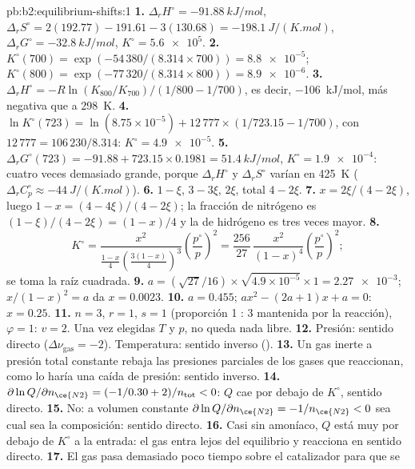 \begin{solution}{pb:b2:equilibrium-shifts:1}
\textbf{1.} $\Delta_r H^\circ = \qty{-91.88}{kJ/mol}$, $\Delta_r S^\circ =
2(192.77) - 191.61 - 3(130.68) = \qty{-198.1}{J/(K.mol)}$, $\Delta_r G^\circ =
\qty{-32.8}{kJ/mol}$, $K^\circ = \num{5.6e5}$.
\textbf{2.} $K^\circ(700) = \exp(-54\,380/(8.314 \times 700)) = \num{8.8e-5}$;
$K^\circ(800) = \exp(-77\,320/(8.314 \times 800)) = \num{8.9e-6}$.
\textbf{3.} $\Delta_r H^\circ = -R\ln(K_{800}/K_{700})/(1/800 - 1/700)$,
es decir, \qty{-106}{kJ/mol}, más negativa que a \qty{298}{K}.
\textbf{4.} $\ln K^\circ(723) = \ln(8.75 \times 10^{-5}) + 12\,777 \times
(1/723.15 - 1/700)$, con $12\,777 = 106\,230/8.314$: $K^\circ =
\num{4.9e-5}$.
\textbf{5.} $\Delta_r G^\circ(723) = -91.88 + 723.15 \times 0.1981 =
\qty{51.4}{kJ/mol}$, $K^\circ = \num{1.9e-4}$: cuatro veces demasiado grande, porque
$\Delta_r H^\circ$ y $\Delta_r S^\circ$ varían en \qty{425}{K}
($\Delta_r C_p^\circ \approx \qty{-44}{J/(K.mol)}$).
\textbf{6.}  $1 - \xi$,  $3 - 3\xi$,  $2\xi$, total $4 -
2\xi$.
\textbf{7.} $x = 2\xi/(4 - 2\xi)$, luego $1 - x = (4 - 4\xi)/(4 - 2\xi)$; la
fracción de nitrógeno es $(1 - \xi)/(4 - 2\xi) = (1 - x)/4$ y la de hidrógeno
es tres veces mayor.
\textbf{8.}
\[
  K^\circ = \frac{x^2}{\frac{1-x}{4}\left(\frac{3(1-x)}{4}\right)^3}
  \left(\frac{p^\circ}{p}\right)^2 = \frac{256}{27}\,\frac{x^2}{(1 - x)^4}
  \left(\frac{p^\circ}{p}\right)^2 ;
\]
se toma la raíz cuadrada.
\textbf{9.} $a = (\sqrt{27}/16) \times \sqrt{4.9 \times 10^{-5}} \times 1 =
\num{2.27e-3}$; $x/(1 - x)^2 = a$ da $x = 0.0023$.
\textbf{10.} $a = 0.455$; $ax^2 - (2a + 1)x + a = 0$: $x = 0.25$.
\textbf{11.} $n = 3$, $r = 1$, $s = 1$ (proporción 1 : 3 mantenida por la reacción),
$\varphi = 1$: $v = 2$. Una vez elegidas $T$ y $p$, no queda nada libre.
\textbf{12.} Presión: sentido directo ($\Delta\nu_{\text{gas}} = -2$). Temperatura:
sentido inverso ().
\textbf{13.} Un gas inerte a presión total constante rebaja las presiones parciales
de los gases que reaccionan, como lo haría una caída de presión: sentido inverso.
\textbf{14.} $\partial\ln Q/\partial n_{\ce{N2}} = (-1/0.30 + 2)/n_{\text{tot}} < 0$:
$Q$ cae por debajo de $K^\circ$, sentido directo.
\textbf{15.} No: a volumen constante $\partial\ln Q/\partial n_{\ce{N2}} =
-1/n_{\ce{N2}} < 0$ sea cual sea la composición: sentido directo.
\textbf{16.} Casi sin amoníaco, $Q$ está muy por debajo de $K^\circ$ a la entrada:
el gas entra lejos del equilibrio y reacciona en sentido directo.
\textbf{17.} El gas pasa demasiado poco tiempo sobre el catalizador para que se

\end{solution}
